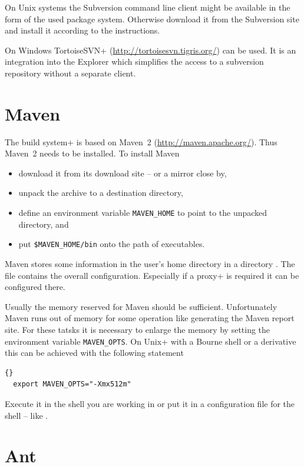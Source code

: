 On Unix systems the Subversion command line client might be available
in the form of the used package system. Otherwise download it from the
Subversion site and install it according to the instructions.

On Windows \+TortoiseSVN+ (\url{http://tortoisesvn.tigris.org/}) can
be used. It is an integration into the Explorer which simplifies the
access to a subversion repository without a separate client.


\section{Maven}

The \+build system+ is based on Maven~2 (\url{http://maven.apache.org/}).
Thus Maven~2 needs to be installed. To install Maven 

\begin{itemize}
\item download it from its download site -- or a mirror close by,
\item unpack the archive to a destination directory,
\item define an environment variable
  \texttt{MAVEN\_HOME} to
  point to the unpacked directory, and
\item put \texttt{\$MAVEN\_HOME/bin} onto the path of executables.
\end{itemize}

Maven stores some information in the user's home directory in a
directory . The file  contains the overall
configuration. Especially if a \+proxy+ is required it can be
configured there.

Usually the memory reserved for Maven should be sufficient. Unfortunately
Maven runs out of memory for some operation like generating the Maven report
site. For these tatsks it is necessary to enlarge the memory by setting the
environment variable
\verb|MAVEN_OPTS|. On \+Unix+ with a
Bourne shell or a derivative this can be achieved with the
following statement
\begin{lstlisting}{}
  export MAVEN_OPTS="-Xmx512m"
\end{lstlisting}
Execute it in the shell you are working in or put it in a configuration file
for the shell -- like .


\section{Ant}

